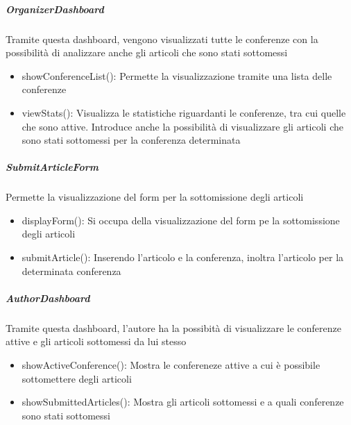 \subparagraph{OrganizerDashboard}
Tramite questa dashboard, vengono visualizzati tutte le conferenze con la possibilità di analizzare anche gli articoli che sono stati sottomessi\\
\begin{itemize}
\item showConferenceList(): Permette la visualizzazione tramite una lista delle conferenze\\
\item viewStats(): Visualizza le statistiche riguardanti le conferenze, tra cui quelle che sono attive. Introduce anche la possibilità di visualizzare gli articoli che sono stati sottomessi per la conferenza determinata\\
\end{itemize}

\subparagraph{SubmitArticleForm}
Permette la visualizzazione del form per la sottomissione degli articoli\\
\begin{itemize}
\item displayForm(): Si occupa della visualizzazione del form pe la sottomissione degli articoli\\
\item submitArticle(): Inserendo l'articolo e la conferenza, inoltra l'articolo per la determinata conferenza\\
\end{itemize}

\subparagraph{AuthorDashboard}
Tramite questa dashboard, l'autore ha la possibità di visualizzare le conferenze attive e gli articoli sottomessi da lui stesso\\
\begin{itemize}
\item showActiveConference(): Mostra le confereneze attive a cui è possibile sottomettere degli articoli\\
\item showSubmittedArticles(): Mostra gli articoli sottomessi e a quali conferenze sono stati sottomessi\\
\end{itemize}
